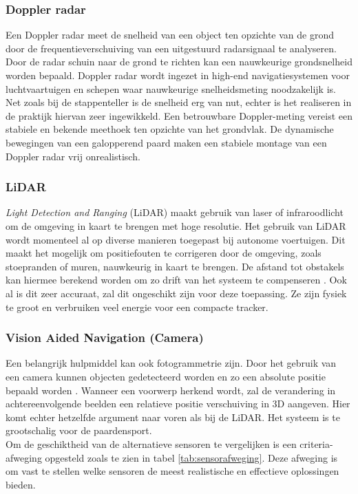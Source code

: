 \subsubsection{Doppler radar}
Een Doppler radar meet de snelheid van een object ten opzichte van de grond door de frequentieverschuiving van een uitgestuurd radarsignaal te analyseren. Door de radar schuin naar de grond te richten kan een nauwkeurige grondsnelheid worden bepaald. Doppler radar wordt ingezet in high-end navigatiesystemen voor luchtvaartuigen en schepen waar nauwkeurige snelheidsmeting noodzakelijk is. Net zoals bij de stappenteller is de snelheid erg van nut, echter is het realiseren in de praktijk hiervan zeer ingewikkeld. Een betrouwbare Doppler-meting vereist een stabiele en bekende meethoek ten opzichte van het grondvlak. De dynamische bewegingen van een galopperend paard maken een stabiele montage van een Doppler radar vrij onrealistisch. 


\subsubsection{LiDAR}
\textit{Light Detection and Ranging} (LiDAR) maakt gebruik van laser of infraroodlicht om de omgeving in kaart te brengen met hoge resolutie. Het gebruik van LiDAR wordt momenteel al op diverse manieren toegepast bij autonome voertuigen. Dit maakt het mogelijk om positiefouten te corrigeren door de omgeving, zoals stoepranden of muren, nauwkeurig in kaart te brengen. De afstand tot obstakels kan hiermee berekend worden om zo drift van het systeem te compenseren \cite{Meng2017RobustLocalization}. Ook al is dit zeer accuraat, zal dit ongeschikt zijn voor deze toepassing. Ze zijn fysiek te groot en verbruiken veel energie voor een compacte tracker.


\subsubsection{Vision Aided Navigation (Camera)}
Een belangrijk hulpmiddel kan ook fotogrammetrie zijn. Door het gebruik van een camera kunnen objecten gedetecteerd worden en zo een absolute positie bepaald worden \cite{NovAtelMultipath2026}. Wanneer een voorwerp herkend wordt, zal de verandering in achtereenvolgende beelden een relatieve positie verschuiving in 3D aangeven. Hier komt echter hetzelfde argument naar voren als bij de LiDAR. Het systeem is te grootschalig voor de paardensport. \\

Om de geschiktheid van de alternatieve sensoren te vergelijken is een criteria-afweging opgesteld zoals te zien in tabel \ref{tab:sensorafweging}. Deze afweging is om vast te stellen welke sensoren de meest realistische en effectieve oplossingen bieden.

